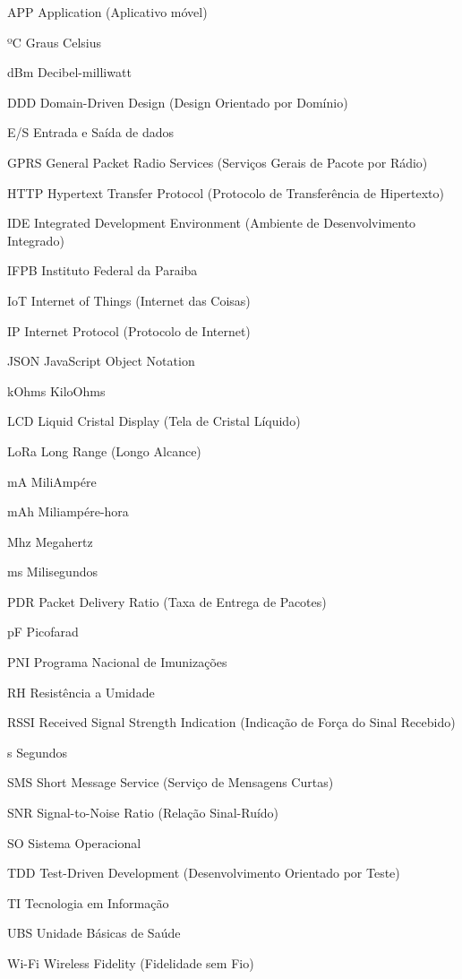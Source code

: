 \listoffigures*
\cleardoublepage

\listoftables*
\cleardoublepage

\begin{siglas}
  \item[APP]    Application (Aplicativo móvel)
  \item[ºC]     Graus Celsius 
  \item[dBm]    Decibel-milliwatt
  \item[DDD]    Domain-Driven Design (Design Orientado por Domínio)
  \item[E/S]    Entrada e Saída de dados
  \item[GPRS]   General Packet Radio Services (Serviços Gerais de Pacote por Rádio)
  \item[HTTP]   Hypertext Transfer Protocol (Protocolo de Transferência de Hipertexto)
  \item[IDE]    Integrated Development Environment (Ambiente de Desenvolvimento Integrado)
  \item[IFPB]   Instituto Federal da Paraiba
  \item[IoT]    Internet of Things (Internet das Coisas)
  \item[IP]     Internet Protocol (Protocolo de Internet)
  \item[JSON]   JavaScript Object Notation
  \item[kOhms]  KiloOhms
  \item[LCD]    Liquid Cristal Display (Tela de Cristal Líquido)
  \item[LoRa]   Long Range (Longo Alcance)
  \item[mA]     MiliAmpére
  \item[mAh]    Miliampére-hora
  \item[Mhz]    Megahertz
  \item[ms]     Milisegundos
  \item[PDR]    Packet Delivery Ratio (Taxa de Entrega de Pacotes)
  \item[pF]     Picofarad
  \item[PNI]    Programa Nacional de Imunizações
  \item[RH]     Resistência a Umidade
  \item[RSSI]   Received Signal Strength Indication (Indicação de Força do Sinal Recebido)
  \item[s]      Segundos
  \item[SMS]    Short Message Service (Serviço de Mensagens Curtas)
  \item[SNR]    Signal-to-Noise Ratio (Relação Sinal-Ruído)
  \item[SO]     Sistema Operacional
  \item[TDD]    Test-Driven Development (Desenvolvimento Orientado por Teste)
  \item[TI]     Tecnologia em Informação
  \item[UBS]    Unidade Básicas de Saúde
  \item[Wi-Fi]  Wireless Fidelity (Fidelidade sem Fio)
\end{siglas}